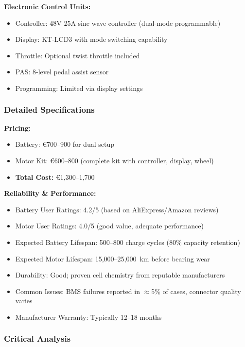 \documentclass[12pt,a4paper]{article}
\begin{document}
\textbf{Electronic Control Units:}
\begin{itemize}
    \item Controller: 48V 25A sine wave controller (dual-mode programmable)
    \item Display: KT-LCD3 with mode switching capability
    \item Throttle: Optional twist throttle included
    \item PAS: 8-level pedal assist sensor
    \item Programming: Limited via display settings
\end{itemize}

\subsubsection{Detailed Specifications}

\textbf{Pricing:}
\begin{itemize}
    \item Battery: €700--900 for dual setup \cite{aliexpress-batteries}
    \item Motor Kit: €600--800 (complete kit with controller, display, wheel) \cite{aliexpress-batteries}
    \item \textbf{Total Cost:} €1,300--1,700
\end{itemize}

\textbf{Reliability \& Performance:}
\begin{itemize}
    \item Battery User Ratings: 4.2/5 (based on AliExpress/Amazon reviews) \cite{aliexpress-batteries, amazon-components}
    \item Motor User Ratings: 4.0/5 (good value, adequate performance) \cite{ebike-review}
    \item Expected Battery Lifespan: 500--800 charge cycles (80\% capacity retention)
    \item Expected Motor Lifespan: 15,000--25,000~km before bearing wear
    \item Durability: Good; proven cell chemistry from reputable manufacturers
    \item Common Issues: BMS failures reported in $\approx$5\% of cases, connector quality varies
    \item Manufacturer Warranty: Typically 12--18 months
\end{itemize}

\subsubsection{Critical Analysis}
\end{document}

